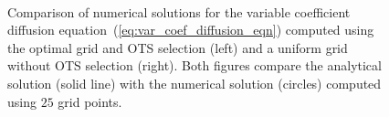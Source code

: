 \documentclass[twocolumn]{article} %
\begin{document}
\begin{figure}[tbh]
\begin{center}
 \ 
\caption{Comparison of numerical solutions for the variable coefficient
diffusion equation~(\ref{eq:var_coef_diffusion_eqn}) computed using 
the optimal grid and OTS selection (left) and a uniform grid without OTS
selection (right).  Both figures compare the analytical solution (solid line)
with the numerical solution (circles) computed using $25$ grid points.
}
\label{fig:var_coef_diffusion_eqn_1d_solns}
\end{center}
\end{figure}
\end{document}
